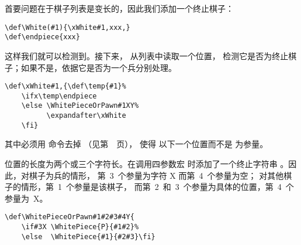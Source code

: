 \documentclass{book}
\begin{document}
首要问题在于棋子列表是变长的，因此我们添加一个终止棋子：
\begin{verbatim}
\def\White(#1){\xWhite#1,xxx,}
\def\endpiece{xxx}
\end{verbatim}
这样我们就可以检测到。接下来， 从列表中读取一个位置，
检测它是否为终止棋子；如果不是，依据它是否为一个兵分别处理。
\begin{verbatim}
\def\xWhite#1,{\def\temp{#1}%
    \ifx\temp\endpiece 
    \else \WhitePieceOrPawn#1XY%
          \expandafter\xWhite 
    \fi}
\end{verbatim}
其中必须用  命令去掉 （见第~\pageref{after:cond}~页），
使得  以下一个位置而不是  为参量。

位置的长度为两个或三个字符长。在调用四参数宏 
时添加了一个终止字符串 。因此，对棋子为兵的情形，
第~3~个参量为字符 \n X 而第~4~个参量为空；
对其他棋子的情形，第~1~个参量是该棋子，
而第~2~和~3~个参量为具体的位置，第~4~个参量为~\n X。
\begin{verbatim}
\def\WhitePieceOrPawn#1#2#3#4Y{
    \if#3X \WhitePiece{P}{#1#2}%
    \else  \WhitePiece{#1}{#2#3}\fi}
\end{verbatim}
\end{document}
